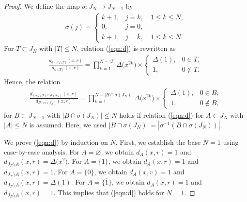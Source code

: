 \documentclass[10pt,a4paper]{amsart}
\numberwithin{equation}{section}
\begin{document}
\begin{proof}
We define the map $\sigma \colon J_N \to J_{N+1}$ by
\begin{gather*}
\sigma(j)=\begin{cases}
k+1,&j=k,\quad 1\leq k \leq N,
\\
0,&j=0,
\\
\overline{k+1},&j=\overline{k},\quad 1\leq k \leq N.
\end{cases}
\end{gather*}
For $T\subset J_N$ with
$|T|\leq N$, relation (\ref{eqn:d}) is rewritten as
\begin{gather*}
\frac{d_{{\sigma(J_N \setminus T)}}(x,r)}{d_{\sigma(T)}(x,r)}=\prod_{k=1}^{N-|T|}
\Delta\big(x^{2k}\big)\times
\begin{cases}
\Delta(1),& 0 \in T,
\\
1,&0 \notin T.
\end{cases}
\end{gather*}
Hence, the relation
\begin{gather}
\frac{d_{{(J_N \setminus B)\cap \sigma(J_N)}}(x,r)}{d_{B \cap \sigma(J_N)}(x,r)}=
\prod_{k=1}^{N-|B \cap \sigma(J_N)|}
\Delta\big(x^{2k}\big)\times
\begin{cases}
\Delta(1),& 0 \in B,\\
1,& 0 \notin B,
\end{cases}
\label{eqn:d2}
\end{gather}
for $B \subset J_{N+1}$ with $|B \cap \sigma(J_N)|\leq N$ holds
if relation (\ref{eqn:d}) for $A \subset J_N$ with $|A|\leq N$ is assumed.
Here, we used $|B\cap \sigma(J_N)|=|\sigma^{-1}(B\cap \sigma(J_N))|$.

We prove (\ref{eqn:d}) by induction on $N$.
First, we establish the base $N=1$ using case-by-case analysis.
For $A=\varnothing$, we obtain $d_A(x,r)=1$ and $d_{J_N \setminus A}(x,r)=\Delta\big(x^2\big)$.
For $A=\{1\}$, we obtain $d_A(x,r)=1$ and $d_{J_N \setminus A}(x,r)=1$.
For $A=\{0\}$, we obtain $d_A(x,r)=1$ and $d_{J_N \setminus A}(x,r)=\Delta(1)$.
For $A=\{\overline{1}\}$, we obtain $d_A(x,r)=1$ and $d_{J_N \setminus A}(x,r)=1$.
This implies that (\ref{eqn:d}) holds for $N=1$.


\end{proof}
\end{document}
